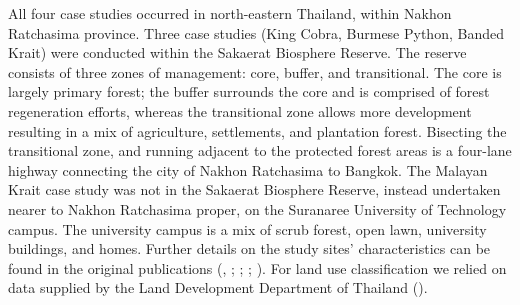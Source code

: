 \documentclass[10pt,a4paper]{article}
\begin{document}
All four case studies occurred in north-eastern Thailand, within Nakhon Ratchasima province.
Three case studies (King Cobra, Burmese Python, Banded Krait) were conducted within the Sakaerat Biosphere Reserve.
The reserve consists of three zones of management: core, buffer, and transitional.
The core is largely primary forest; the buffer surrounds the core and is comprised of forest regeneration efforts, whereas the transitional zone allows more development resulting in a mix of agriculture, settlements, and plantation forest.
Bisecting the transitional zone, and running adjacent to the protected forest areas is a four-lane highway connecting the city of Nakhon Ratchasima to Bangkok.
The Malayan Krait case study was not in the Sakaerat Biosphere Reserve, instead undertaken nearer to Nakhon Ratchasima proper, on the Suranaree University of Technology campus.
The university campus is a mix of scrub forest, open lawn, university buildings, and homes.
Further details on the study sites' characteristics can be found in the original publications (, ; ; ; ).
For land use classification we relied on data supplied by the Land Development Department of Thailand ().
\end{document}
